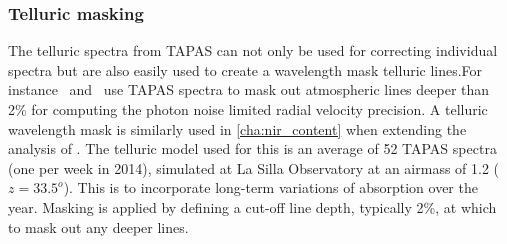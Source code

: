 \subsubsection{Telluric masking}
The telluric spectra from {TAPAS} can not only be used for correcting individual spectra but are also easily used to create a wavelength mask telluric lines.For instance~\citet{figueira_radial_2016} and~\citet{artigau_optical_2018} use {TAPAS} spectra to mask out atmospheric lines deeper than 2\% for computing the photon noise limited radial velocity precision.
A telluric wavelength mask is similarly used in \cref{cha:nir_content} when extending the analysis of \citet{figueira_radial_2016}.
The telluric model used for this is an average of 52 {TAPAS} spectra (one per week in 2014), simulated at La Silla Observatory at an airmass of 1.2 (\(z = 33.5^{o}\)).
This is to incorporate long-term variations of absorption over the year.
Masking is applied by defining a cut-off line depth, typically 2\%, at which to mask out any deeper  lines.